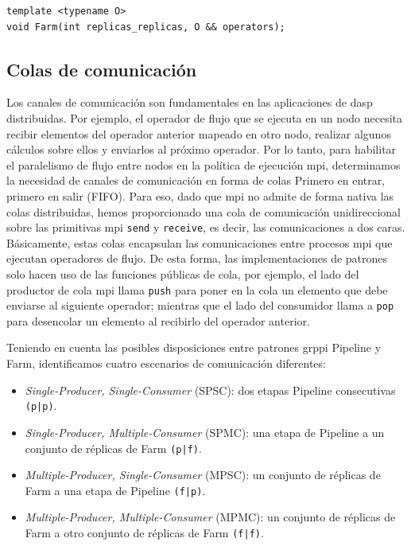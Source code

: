 \begin{lstlisting}[linewidth=1\columnwidth,caption={Interfaz patrón Farm en \acrshort{grppi} \acrshort{mpi}.},label={fig:grppi-Farm-pattern},frame=single]
template <typename O>
void Farm(int replicas_replicas, O && operators);  
\end{lstlisting}
\vspace{0.35cm}

\subsection{Colas de comunicación}
\label{sec:colas_comunicacion}

Los canales de comunicación son fundamentales en las aplicaciones de \acrshort{dasp} distribuidas. Por ejemplo, el operador de flujo que se ejecuta en un nodo necesita recibir elementos del operador anterior mapeado en otro nodo, realizar algunos cálculos sobre ellos y enviarlos al próximo operador. Por lo tanto, para habilitar el paralelismo de flujo entre nodos en la política de ejecución \acrshort{mpi}, determinamos la necesidad de canales de comunicación en forma de colas Primero en entrar, primero en salir (FIFO). Para eso, dado que \acrshort{mpi} no admite de forma nativa las colas distribuidas, hemos proporcionado una cola de comunicación unidireccional sobre las primitivas \acrshort{mpi} \texttt{send} y \texttt{receive}, es decir, las comunicaciones a dos caras. Básicamente, estas colas encapsulan las comunicaciones entre procesos \acrshort{mpi} que ejecutan operadores de flujo. De esta forma, las implementaciones de patrones solo hacen uso de las funciones públicas de cola, por ejemplo, el lado del productor de cola \acrshort{mpi} llama \texttt{push} para poner en la cola un elemento que debe enviarse al siguiente operador; mientras que el lado del consumidor llama a \texttt{pop} para desencolar un elemento al recibirlo del operador anterior.

Teniendo en cuenta las posibles disposiciones entre patrones \acrshort{grppi} Pipeline y Farm, identificamos cuatro escenarios de comunicación diferentes:
\begin{itemize}
\item \emph{Single-Producer, Single-Consumer} (SPSC): dos etapas Pipeline consecutivas \texttt{(p|p)}.
\item \emph{Single-Producer, Multiple-Consumer} (SPMC): una etapa de Pipeline a un conjunto de réplicas de Farm \texttt{(p|f)}.
\item \emph{Multiple-Producer, Single-Consumer} (MPSC): un conjunto de réplicas de Farm a una etapa de Pipeline \texttt{(f|p)}.
\item \emph{Multiple-Producer, Multiple-Consumer} (MPMC): un conjunto de réplicas de Farm a otro conjunto de réplicas de Farm \texttt{(f|f)}. 
\end{itemize}


